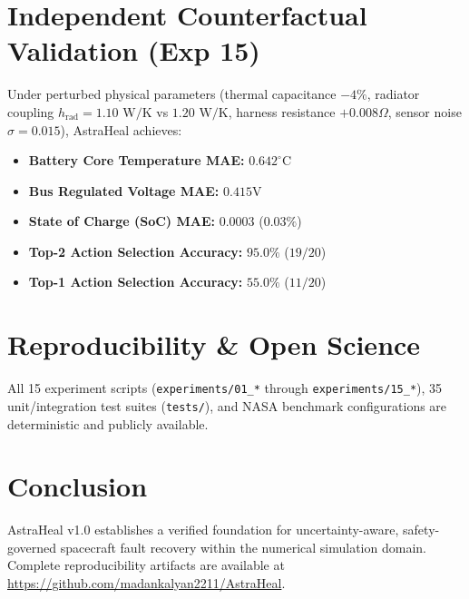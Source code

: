 \documentclass[journal]{article}
\begin{document}
\section{Independent Counterfactual Validation (Exp 15)}
Under perturbed physical parameters (thermal capacitance $-4\%$, radiator coupling $h_{\text{rad}} = 1.10\text{ W/K}$ vs $1.20\text{ W/K}$, harness resistance $+0.008\Omega$, sensor noise $\sigma = 0.015$), AstraHeal achieves:
\begin{itemize}
    \item \textbf{Battery Core Temperature MAE:} $0.642^\circ\text{C}$
    \item \textbf{Bus Regulated Voltage MAE:} $0.415\text{V}$
    \item \textbf{State of Charge (SoC) MAE:} $0.0003$ ($0.03\%$)
    \item \textbf{Top-2 Action Selection Accuracy:} $95.0\%$ ($19 / 20$)
    \item \textbf{Top-1 Action Selection Accuracy:} $55.0\%$ ($11 / 20$)
\end{itemize}

\section{Reproducibility \& Open Science}
All 15 experiment scripts (\texttt{experiments/01\_*} through \texttt{experiments/15\_*}), 35 unit/integration test suites (\texttt{tests/}), and NASA benchmark configurations are deterministic and publicly available.

\section{Conclusion}
AstraHeal v1.0 establishes a verified foundation for uncertainty-aware, safety-governed spacecraft fault recovery within the numerical simulation domain. Complete reproducibility artifacts are available at \url{https://github.com/madankalyan2211/AstraHeal}.



\end{document}

